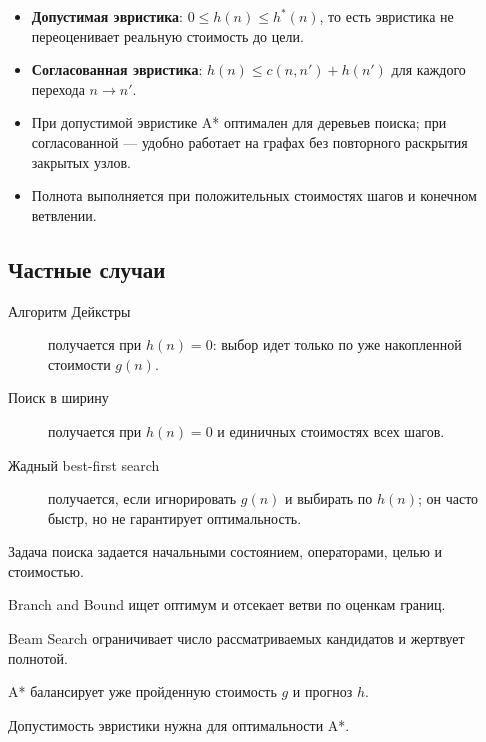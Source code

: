 \begin{itemize}
    \item \textbf{Допустимая эвристика}: $0\leq h(n)\leq h^*(n)$, то есть эвристика не переоценивает реальную стоимость до цели.
    \item \textbf{Согласованная эвристика}: $h(n)\leq c(n,n')+h(n')$ для каждого перехода $n\to n'$.
    \item При допустимой эвристике A* оптимален для деревьев поиска; при согласованной --- удобно работает на графах без повторного раскрытия закрытых узлов.
    \item Полнота выполняется при положительных стоимостях шагов и конечном ветвлении.
\end{itemize}

\subsection*{Частные случаи}

\begin{description}
    \item[Алгоритм Дейкстры] получается при $h(n)=0$: выбор идет только по уже накопленной стоимости $g(n)$.
    \item[Поиск в ширину] получается при $h(n)=0$ и единичных стоимостях всех шагов.
    \item[Жадный best-first search] получается, если игнорировать $g(n)$ и выбирать по $h(n)$; он часто быстр, но не гарантирует оптимальность.
\end{description}

\begin{important}
    \item Задача поиска задается начальными состоянием, операторами, целью и стоимостью.
    \item Branch and Bound ищет оптимум и отсекает ветви по оценкам границ.
    \item Beam Search ограничивает число рассматриваемых кандидатов и жертвует полнотой.
    \item A* балансирует уже пройденную стоимость $g$ и прогноз $h$.
    \item Допустимость эвристики нужна для оптимальности A*.
\end{important}
